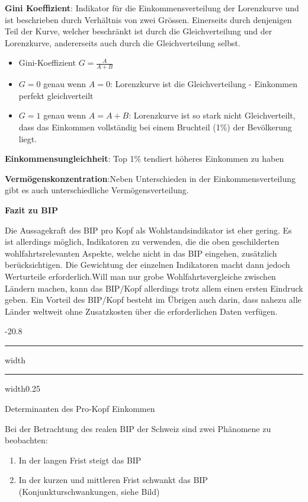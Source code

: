 \documentclass[9pt, landscape, fleqn]{scrartcl}
\makeatletter
\renewcommand{\subsection}{\@startsection{subsection}{1}{0mm}%
{-2\baselineskip}{0.8\baselineskip}%
{\hrule depth 0.2pt width\columnwidth\hrule depth0.75pt
width0.25\columnwidth\vspace*{1.2em}\large\bfseries\rmfamily}}
\makeatother
\begin{document}
\begin{multicols*}{3}
\textbf{Gini Koeffizient}: Indikator für die Einkommensverteilung der Lorenzkurve und ist beschrieben durch Verhältnis von zwei Grössen. Einerseits durch denjenigen Teil der Kurve, welcher beschränkt ist durch die Gleichverteilung und der Lorenzkurve, andererseits auch durch die Gleichverteilung selbst.

\begin{itemize}
    \item Gini-Koeffizient $G=\frac{A}{A+B}$
    \item $G = 0$ genau wenn $A=0$: Lorenzkurve ist die Gleichverteilung - Einkommen perfekt gleichverteilt 
    \item $G=1$ genau wenn $A=A+B$: Lorenzkurve ist so stark nicht Gleichverteilt, dass das Einkommen vollständig bei einem Bruchteil (1\%) der Bevölkerung liegt. 
\end{itemize}

\textbf{Einkommensungleichheit}: Top 1\% tendiert höheres Einkommen zu haben \newline \newline

\textbf{Vermögenskonzentration}:Neben Unterschieden in der Einkommensverteilung gibt es auch unterschiedliche Vermögensverteilung. \newline \newline

\textbf{Fazit zu BIP}

Die Aussagekraft des BIP pro Kopf als Wohlstandsindikator ist eher gering. Es ist allerdings möglich, Indikatoren zu verwenden, die die oben geschilderten wohlfahrtsrelevanten Aspekte, welche nicht in das BIP eingehen, zusätzlich berücksichtigen. Die Gewichtung der einzelnen Indikatoren macht dann jedoch Werturteile erforderlich.Will man nur grobe Wohlfahrtsvergleiche zwischen Ländern machen, kann das BIP/Kopf allerdings trotz allem einen ersten Eindruck geben. Ein Vorteil des BIP/Kopf besteht im Übrigen auch darin, dass nahezu alle Länder weltweit ohne Zusatzkosten über die erforderlichen Daten verfügen.

\subsection{Determinanten des Pro-Kopf Einkommen}

Bei der Betrachtung des realen BIP der Schweiz sind zwei Phänomene zu beobachten:

\begin{enumerate}
    \item In der langen Frist steigt das BIP
    \item In der kurzen und mittleren Frist schwankt das BIP (Konjunkturschwankungen, siehe Bild)
\end{enumerate}


\end{multicols*}
\end{document}
